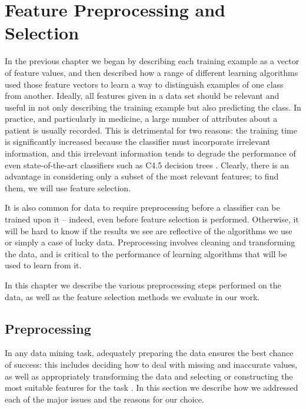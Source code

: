 \chapter{Feature Preprocessing and Selection} \label{chap:features}

In the previous chapter we began by describing each training example as a
vector of feature values, and then described how a range of different
learning algorithms used those feature vectors to learn a way to
distinguish examples of one class from another. Ideally, all features given
in a data set should be relevant and useful in not only describing the training
example but also predicting the class.
In practice, and particularly
in medicine, a large number of attributes about a patient is usually recorded.
This is detrimental for two reasons: the training time is significantly
increased because the classifier must incorporate irrelevant information, and
this irrelevant information tends to degrade the performance
of even state-of-the-art classifiers such as C4.5 decision trees
\cite{Witten2005}. Clearly, there is an advantage in considering only a subset
of the most relevant features; to find them, we will use feature selection.

It is also common for data to require preprocessing before a classifier can
be trained upon it -- indeed, even before feature selection is performed.
Otherwise, it will be hard to know if the results we see are reflective of
the algorithms we use or simply a case of lucky data. Preprocessing involves
cleaning and transforming the data, and is critical to the performance of
learning algorithms that will be used to learn from it.

In this chapter we describe the various preprocessing steps performed on
the data, as well as the feature selection methods we evaluate in our work.

\section{Preprocessing}
In any data mining task, adequately preparing the data ensures the best
chance of success: this includes deciding how to deal with missing and
inaccurate values, as well as appropriately transforming the data
\citep{Witten2005} and selecting or constructing the most suitable features
for the task \citep{Kotsiantis2006}.
In this section we describe how we addressed each of
the major issues and the reasons for our choice.

